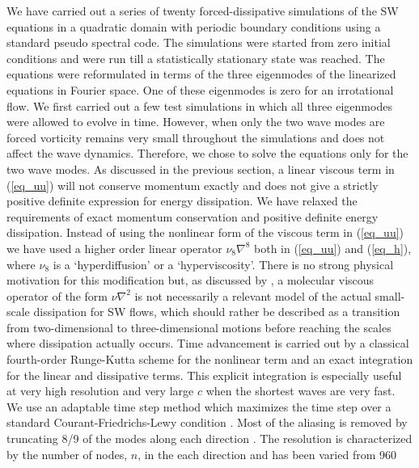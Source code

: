 We have carried out a series of twenty forced-dissipative simulations of the SW
equations in a quadratic domain with periodic boundary conditions using a
standard pseudo spectral code. The simulations were started from zero initial
conditions and were run till a statistically stationary state was reached. The
equations were reformulated in terms of the three eigenmodes of the linearized
equations in Fourier space. One of these eigenmodes is zero for an irrotational
flow. We first carried out a few test simulations in which all three eigenmodes
were allowed to evolve in time. However, when only the two wave modes are
forced vorticity remains very small throughout the simulations and does not
affect the wave dynamics. Therefore, we chose to solve the equations only for
the two wave modes. As discussed in the previous section, a linear viscous term
in (\ref{eq_uu}) will not conserve momentum exactly and does not give a
strictly positive definite expression for energy dissipation. We have relaxed
the requirements of exact momentum conservation and positive definite energy
dissipation. Instead of using the nonlinear form of the viscous term in
(\ref{eq_uu}) we have used a higher order linear operator $ \nu_8 \nabla^{8} $
both in (\ref{eq_uu}) and (\ref{eq_h}), where $ \nu_8 $ is a `hyperdiffusion'
or a `hyperviscosity'. There is no strong physical motivation for this
modification but, as discussed by \cite{FargeSadourny1989}, a molecular viscous
operator of the form $\nu \nabla^2 $ is not necessarily a relevant model of the
actual small-scale dissipation for SW flows, which should rather be described
as a transition from two-dimensional to three-dimensional motions before
reaching the scales where dissipation actually occurs.
%
Time advancement is carried out by a classical fourth-order Runge-Kutta scheme
for the nonlinear term and an exact integration for the linear and dissipative
terms. This explicit integration is especially useful at very high resolution
and very large $c$ when the shortest waves are very fast. We use an adaptable
time step method which maximizes the time step over a standard
Courant-Friedrichs-Lewy condition \cite[]{Lundbladh1999,
AugierChomazBillant2012}.
%
Most of the aliasing is removed by truncating 8/9 of the modes along each
direction \cite[for a detail discussion on the issues of the non-conservation
of the non-quadratic energy and the aliasing errors in the truncated one-layer
shallow water model, see][]{FargeSadourny1989}. The resolution is characterized
by the number of nodes, $n$, in the each direction and has been varied from 960
